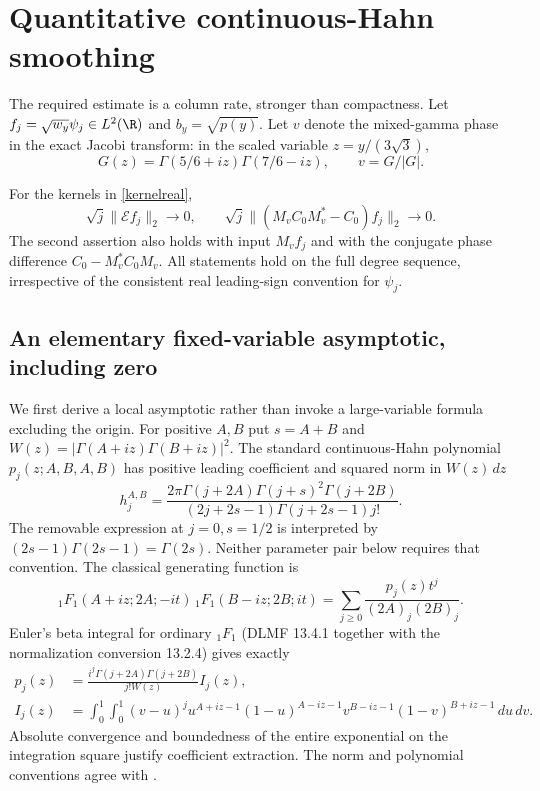 \section{Quantitative continuous-Hahn smoothing}\label{sec:smoothing}
The required estimate is a column rate, stronger than compactness.
Let $f_j=\sqrt{w_y}\psi_j\in L^2(\R)$ and $b_y=\sqrt{p(y)}$.
Let $v$ denote the mixed-gamma phase in the exact Jacobi transform:
in the scaled variable $z=y/(3\sqrt3)$,
\[
 G(z)=\Gamma(5/6+iz)\Gamma(7/6-iz),\qquad v=G/|G|.
\]

\begin{theorem}\label{thm:smoothing}
For the kernels in \eqref{kernelreal},
\begin{equation}\label{smoothingrates}
 \sqrt j\|\mathcal E f_j\|_2\longrightarrow0,\qquad
 \sqrt j\|(M_vC_0M_v^*-C_0)f_j\|_2\longrightarrow0.
\end{equation}
The second assertion also holds with input $M_vf_j$ and with the
conjugate phase difference $C_0-M_v^*C_0M_v$. All statements hold
on the full degree sequence, irrespective of the consistent real
leading-sign convention for $\psi_j$.
\end{theorem}

\subsection{An elementary fixed-variable asymptotic, including zero}
We first derive a local asymptotic rather than invoke a large-variable
formula excluding the origin. For positive $A,B$ put $s=A+B$ and
$W(z)=|\Gamma(A+iz)\Gamma(B+iz)|^2$.
The standard continuous-Hahn polynomial $p_j(z;A,B,A,B)$ has positive
leading coefficient and squared norm in $W(z)\,dz$
\begin{equation}\label{Hahnnorm}
 h_j^{A,B}=\frac{2\pi\Gamma(j+2A)\Gamma(j+s)^2\Gamma(j+2B)}
              {(2j+2s-1)\Gamma(j+2s-1)j!}.
\end{equation}
The removable expression at $j=0,s=1/2$ is interpreted by
$(2s-1)\Gamma(2s-1)=\Gamma(2s)$. Neither parameter pair below
requires that convention. The classical generating function
\cite[DLMF 18.23.6]{dlmf} is
\[
 {}_1F_1(A+iz;2A;-it)\,{}_1F_1(B-iz;2B;it)
       =\sum_{j\ge0}\frac{p_j(z)t^j}{(2A)_j(2B)_j}.
\]
Euler's beta integral for ordinary ${}_1F_1$ (DLMF 13.4.1 together
with the normalization conversion 13.2.4) gives exactly
\begin{align}
 p_j(z)&=\frac{i^j\Gamma(j+2A)\Gamma(j+2B)}{j!W(z)}I_j(z),
 \label{Hahnbeta}\\
 I_j(z)&=\int_0^1\!\int_0^1(v-u)^j
 u^{A+iz-1}(1-u)^{A-iz-1}
 v^{B-iz-1}(1-v)^{B+iz-1}\,du\,dv.\nonumber
\end{align}
Absolute convergence and boundedness of the entire exponential on
the integration square justify coefficient extraction. The norm
and polynomial conventions agree with \cite[Equations (1.1)--(1.4)]{cll}.

